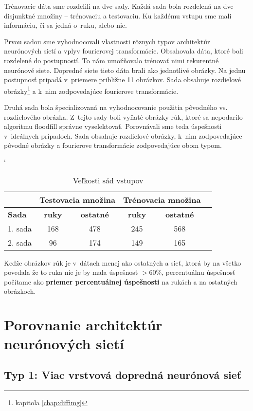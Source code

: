 Trénovacie dáta sme rozdelili na dve sady. Každá sada bola rozdelená na dve disjunktné množiny -- trénovaciu a testovaciu. Ku každému vstupu sme mali informáciu, či sa jedná o~ruku, alebo nie.

Prvou sadou sme vyhodnocovali vlastnosti rôznych typov architektúr neurónových sietí a vplyv fourierovej transformácie. Obsahovala dáta, ktoré boli rozdelené do postupností. To nám umožňovalo trénovať nimi rekurentné neurónové siete. Dopredné siete tieto dáta brali ako jednotlivé obrázky. Na jednu postupnosť pripadá v~priemere približne 11 obrázkov. Sada obsahuje rozdielové obrázky\footnote{kapitola \ref{chap:diffimg}} a k~nim zodpovedajúce fourierove transformácie.

Druhá sada bola špecializovaná na vyhodnocovanie použitia pôvodného vs. rozdielového obrázka. Z~tejto sady boli vyňaté obrázky rúk, ktoré sa nepodarilo algoritmu floodfill správne vyselektovať. Porovnávali sme teda úspešnosti v~ideálnych prípadoch. Sada obsahuje rozdielové obrázky, k~nim zodpovedajúce pôvodné obrázky a fourierove transformácie zodpovedajúce obom typom.

\begin{table}[h]
\catcode` %
\centering
\begin{tabular}{|l|c|c|c|c|c|}
\cline{2-5}
\multicolumn{1}{l}{} & \multicolumn{2}{|c|}{\textbf{Testovacia množina}} & \multicolumn{2}{c|}{\textbf{Trénovacia množina}}\\ 
\hline
\textbf{Sada} & \textbf{ruky} & \textbf{ostatné} & \textbf{ruky} & \textbf{ostatné} \\ \hline
1. sada & 168 & 478 & 245  & 568 \\ \hline
2. sada & 96 & 174 & 149 & 165 \\ 
\hline
\end{tabular}
\caption{Veľkosti sád vstupov}
\label{tab:neuroncountcmp}
\end{table}

Keďže obrázkov rúk je v~dátach menej ako ostatných a sieť, ktorá by na všetko povedala že to ruka nie je by mala úspešnosť $>60\%$, percentuálnu úspešnosť počítame ako \textbf{priemer percentuálnej úspešnosti} na rukách a na ostatných obrázkoch.

\section{Porovnanie architektúr neurónových sietí}
\label{chap:experiments_arch}

\subsection{Typ 1: Viac vrstvová dopredná neurónová sieť}

